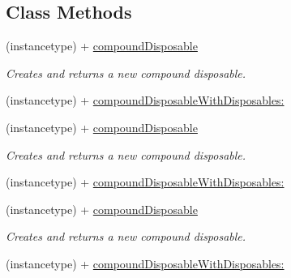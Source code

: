 \subsection*{Class Methods}
\begin{DoxyCompactItemize}
\item 
\mbox{\label{interface_r_a_c_compound_disposable_a6352abe7deb93063a0285c4b719bd0d5}} 
(instancetype) + \mbox{\hyperlink{interface_r_a_c_compound_disposable_a6352abe7deb93063a0285c4b719bd0d5}{compound\+Disposable}}
\begin{DoxyCompactList}\small\item\em Creates and returns a new compound disposable. \end{DoxyCompactList}\item 
(instancetype) + \mbox{\hyperlink{interface_r_a_c_compound_disposable_afd4c99dd46b106061bf03ba0652b3b24}{compound\+Disposable\+With\+Disposables\+:}}
\item 
\mbox{\label{interface_r_a_c_compound_disposable_a6352abe7deb93063a0285c4b719bd0d5}} 
(instancetype) + \mbox{\hyperlink{interface_r_a_c_compound_disposable_a6352abe7deb93063a0285c4b719bd0d5}{compound\+Disposable}}
\begin{DoxyCompactList}\small\item\em Creates and returns a new compound disposable. \end{DoxyCompactList}\item 
(instancetype) + \mbox{\hyperlink{interface_r_a_c_compound_disposable_afd4c99dd46b106061bf03ba0652b3b24}{compound\+Disposable\+With\+Disposables\+:}}
\item 
\mbox{\label{interface_r_a_c_compound_disposable_a6352abe7deb93063a0285c4b719bd0d5}} 
(instancetype) + \mbox{\hyperlink{interface_r_a_c_compound_disposable_a6352abe7deb93063a0285c4b719bd0d5}{compound\+Disposable}}
\begin{DoxyCompactList}\small\item\em Creates and returns a new compound disposable. \end{DoxyCompactList}\item 
(instancetype) + \mbox{\hyperlink{interface_r_a_c_compound_disposable_afd4c99dd46b106061bf03ba0652b3b24}{compound\+Disposable\+With\+Disposables\+:}}
\end{DoxyCompactItemize}
